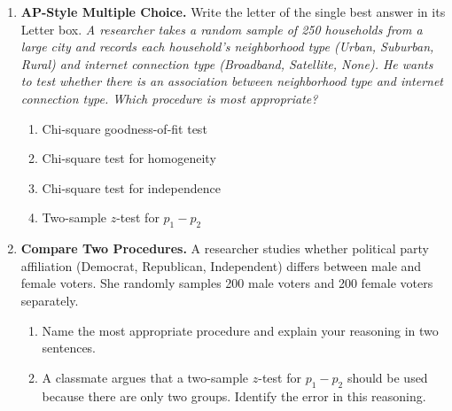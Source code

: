 \documentclass[10pt]{article}
\begin{document}
\begin{enumerate}
\vspace{0.10in}

\boxguard[12]
\item \textbf{AP-Style Multiple Choice.} Write the letter of the single best answer in its Letter box. \;
      \textit{A researcher takes a random sample of 250 households from a large city and records
      each household's neighborhood type (Urban, Suburban, Rural) and internet connection type
      (Broadband, Satellite, None). He wants to test whether there is an association between
      neighborhood type and internet connection type. Which procedure is most appropriate?}

      \begin{enumerate}[label=(\Alph*)]
        \item Chi-square goodness-of-fit test
        \item Chi-square test for homogeneity
        \item Chi-square test for independence
        \item Two-sample $z$-test for $p_1 - p_2$
              \hfill{}
      \end{enumerate}

\vspace{0.10in}

\newpage
\item \textbf{Compare Two Procedures.} \;
      A researcher studies whether political party affiliation (Democrat, Republican, Independent)
      differs between male and female voters. She randomly samples 200 male voters and 200 female
      voters separately.

      \begin{enumerate}[label=\alph*.]
        \boxguard[16]
        \item Name the most appropriate procedure and explain your reasoning in two sentences.

        \boxguard[16]
        \item A classmate argues that a two-sample $z$-test for $p_1 - p_2$ should be used
              because there are only two groups. Identify the error in this reasoning.


\end{enumerate}
\end{enumerate}
\end{document}
